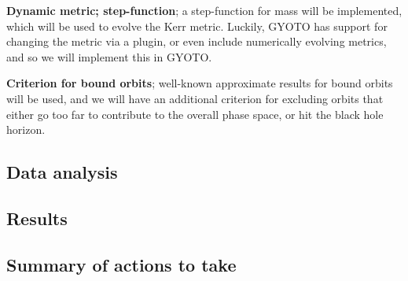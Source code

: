 \documentclass[a4paper,10pt]{article}
\begin{document}
\textbf{Dynamic metric; step-function}; a step-function for mass will be implemented, which will be used to evolve the Kerr metric. 
Luckily, GYOTO has support for changing the metric via a plugin, or even include numerically evolving metrics, and so we will 
implement this in GYOTO.

\textbf{Criterion for bound orbits}; well-known approximate results for bound orbits will be used, and we will have an additional criterion 
for excluding orbits that either go too far to contribute to the overall phase space, or hit the black hole horizon.




\subsection{Data analysis}


\subsection{Results}


\subsection{Summary of actions to take}
\end{document}
